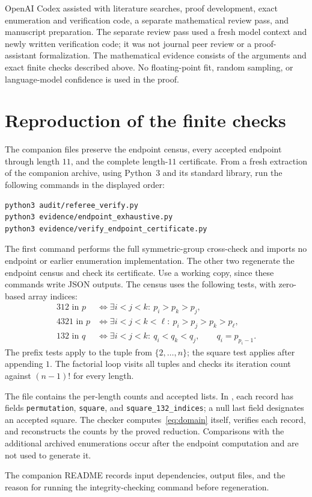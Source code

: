 \documentclass[11pt,a4paper]{article}
\begin{document}
OpenAI Codex assisted with literature searches, proof development, exact
enumeration and verification code, a separate mathematical review pass, and
manuscript preparation. The separate review pass used a fresh model context
and newly written verification code; it was not journal peer review or a
proof-assistant formalization. The mathematical evidence consists of the
arguments and exact finite checks described above. No floating-point fit,
random sampling, or language-model confidence is used in the proof.

\appendix
\section{Reproduction of the finite checks}\label{sec:reproduce}

The companion files preserve the endpoint census, every accepted endpoint
through length $11$, and the complete length-$11$ certificate. From a fresh
extraction of the companion archive, using Python~3 and its standard library,
run the following commands in the displayed order:
\begin{lstlisting}[basicstyle=\small\ttfamily,columns=fullflexible,keepspaces=true,showstringspaces=false,breaklines=true]
python3 audit/referee_verify.py
python3 evidence/endpoint_exhaustive.py
python3 evidence/verify_endpoint_certificate.py
\end{lstlisting}
The first command performs the full symmetric-group cross-check and imports
no endpoint or earlier enumeration implementation. The other two regenerate
the endpoint census and check its certificate. Use a working copy, since
these commands write JSON outputs. The census uses the following tests,
with zero-based array indices:
\begin{align*}
 312\text{ in }p&\Longleftrightarrow \exists i<j<k:\ p_i>p_k>p_j,\\
 4321\text{ in }p&\Longleftrightarrow \exists i<j<k<\ell:\ p_i>p_j>p_k>p_\ell,\\
 132\text{ in }q&\Longleftrightarrow \exists i<j<k:\ q_i<q_k<q_j,
 \qquad q_i=p_{p_i-1}.
\end{align*}
The prefix tests apply to the tuple from $\{2,\ldots,n\}$; the square
test applies after appending $1$. The factorial loop visits all tuples and
checks its iteration count against $(n-1)!$ for every length.

The file  contains the per-length
counts and accepted lists. In ,
each record has fields \texttt{permutation}, \texttt{square}, and
\texttt{square\_132\_indices}; a null last field designates an accepted
square. The checker computes~\eqref{eq:domain} itself, verifies each record,
and reconstructs the counts by the proved reduction. Comparisons with the
additional archived enumerations occur after the endpoint computation and
are not used to generate it.

The companion README records input dependencies, output files, and the
reason for running the integrity-checking command before regeneration.



\end{document}
